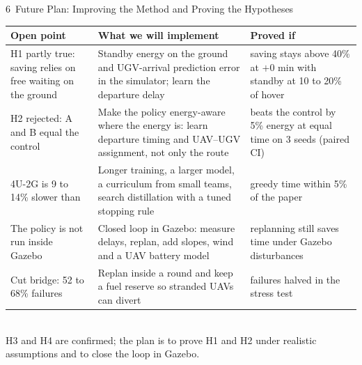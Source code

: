 \documentclass[aspectratio=169,10pt]{beamer}
\begin{document}
\begin{frame}{6 \,Future Plan: Improving the Method and Proving the Hypotheses}
\centering\scriptsize
\renewcommand{\arraystretch}{1.35}
\begin{tabular}{@{}P{3.3cm}P{5.7cm}P{3.5cm}@{}}
\toprule
\textbf{Open point} & \textbf{What we will implement} & \textbf{Proved if}\\
\midrule
H1 partly true: saving relies on free waiting on the ground & Standby energy on the ground and UGV-arrival prediction error in the simulator; learn the departure delay & saving stays above 40\% at $+0$ min with standby at 10 to 20\% of hover\\
H2 rejected: A and B equal the control & Make the policy energy-aware where the energy is: learn departure timing and UAV--UGV assignment, not only the route & beats the control by 5\% energy at equal time on 3 seeds (paired CI)\\
4U-2G is 9 to 14\% slower than~\cite{base} & Longer training, a larger model, a curriculum from small teams, search distillation with a tuned stopping rule & greedy time within 5\% of the paper\\
The policy is not run inside Gazebo~\cite{gazebo} & Closed loop in Gazebo: measure delays, replan, add slopes, wind and a UAV battery model & replanning still saves time under Gazebo disturbances\\
Cut bridge: 52 to 68\% failures & Replan inside a round and keep a fuel reserve so stranded UAVs can divert & failures halved in the stress test\\
\bottomrule
\end{tabular}\\[2mm]
{\small H3 and H4 are confirmed; the plan is to prove H1 and H2 under realistic assumptions and to close the loop in Gazebo.}
\end{frame}
\end{document}
